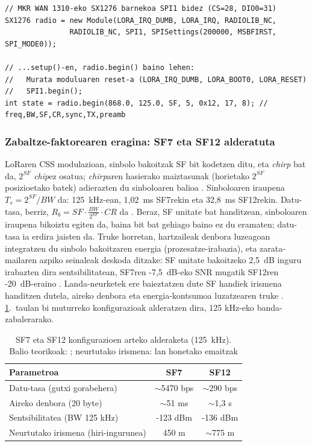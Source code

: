 \documentclass[10pt]{article}
\begin{document}
\begin{lstlisting}[style=terminal]
// MKR WAN 1310-eko SX1276 barnekoa SPI1 bidez (CS=28, DIO0=31)
SX1276 radio = new Module(LORA_IRQ_DUMB, LORA_IRQ, RADIOLIB_NC,
               RADIOLIB_NC, SPI1, SPISettings(200000, MSBFIRST, SPI_MODE0));

// ...setup()-en, radio.begin() baino lehen:
//   Murata moduluaren reset-a (LORA_IRQ_DUMB, LORA_BOOT0, LORA_RESET)
//   SPI1.begin();
int state = radio.begin(868.0, 125.0, SF, 5, 0x12, 17, 8); // freq,BW,SF,CR,sync,TX,preamb
\end{lstlisting}

\subsubsection{Zabaltze-faktorearen eragina: SF7 eta SF12 alderatuta}

\ac{LoRa}ren \ac{CSS} modulazioan, sinbolo bakoitzak \ac{SF} bit kodetzen ditu, eta \textit{chirp} bat da, $2^{SF}$ \textit{chip}ez osatua; \textit{chirp}aren hasierako maiztasunak (horietako $2^{SF}$ posizioetako batek) adierazten du sinboloaren balioa \cite{vangelista2017}. Sinboloaren iraupena $T_s=2^{SF}/BW$ da: 125~kHz-ean, 1,02~ms SF7rekin eta 32,8~ms SF12rekin. Datu-tasa, berriz, $R_b = SF\cdot\frac{BW}{2^{SF}}\cdot CR$ da \cite{an1200_13}. Beraz, \ac{SF} unitate bat handitzean, sinboloaren iraupena bikoiztu egiten da, baina bit bat gehiago baino ez du eramaten; datu-tasa ia erdira jaisten da. Truke horretan, hartzaileak denbora luzeagoan integratzen du sinbolo bakoitzaren energia (prozesatze-irabazia), eta zarata-mailaren azpiko seinaleak deskoda ditzake: \ac{SF} unitate bakoitzeko 2,5~dB inguru irabazten dira sentsibilitatean, SF7ren -7,5~dB-eko \ac{SNR} mugatik SF12ren -20~dB-eraino \cite{sx1276datasheet,augustin2016}. Landa-neurketek ere baieztatzen dute \ac{SF} handiek irismena handitzen dutela, aireko denbora eta energia-kontsumoa luzatzearen truke \cite{sanchez2018,petajajarvi2015}. \ref{taula:sf}.~taulan bi muturreko konfigurazioak alderatzen dira, 125 kHz-eko banda-zabalerarako.\\

\begin{table}[H]
\centering
\begin{tabular}{l c c}
\hline
\textbf{Parametroa} & \textbf{SF7} & \textbf{SF12} \\
\hline
Datu-tasa (gutxi gorabehera) & $\sim$5470 bps & $\sim$290 bps \\
Aireko denbora (20 byte) & $\sim$51 ms & $\sim$1,3 s \\
Sentsibilitatea (\acs{BW} 125 kHz) & -123 dBm & -136 dBm \\
Neurtutako irismena (hiri-ingurunea) & 450 m & $\sim$775 m \\
\hline
\end{tabular}
\caption{SF7 eta SF12 konfigurazioen arteko alderaketa (125~kHz). Balio teorikoak: \cite{sx1276datasheet,an1200_13}; neurtutako irismena: lan honetako emaitzak}
\label{taula:sf}
\end{table}
\end{document}
